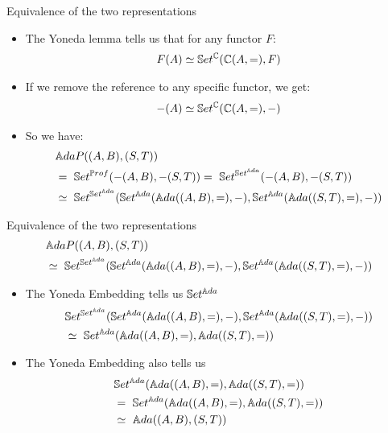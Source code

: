 \begin{frame}[fragile]{Equivalence of the two representations}
	\begin{itemize}
		\item The Yoneda lemma tells us that for any functor $F$:
		\begin{align*}
			F(A) \simeq \mathbb{S}et^{\mathbb{C}}(\mathbb{C}(A, =), F)
		\end{align*}
		\pause\item If we remove the reference to any specific functor, we get:
		\begin{align*}
			-(A) \simeq \mathbb{S}et^{\mathbb{C}}(\mathbb{C}(A, =), -)
		\end{align*}
		\vspace{-18pt}\pause\item So we have:
		\begin{align*}
			&\bAdaP ((A,B),(S,T))\\
			&=\ \bSet^{\bProf}(-(A, B), -(S, T)) =\ \bSet^{\bSet^\bAda}(-(A, B), -(S, T)) \\ 
			&\simeq\ \bSet^{\bSet^\bAda}(\bSet^\bAda(\bAda((A, B), =), -), \bSet^\bAda(\bAda((S, T), =), -))\\
		\end{align*}
	\end{itemize}
\end{frame}
\begin{frame}[fragile]{Equivalence of the two representations}
	\begin{align*}
		&\mathbb{A}daP ((A,B),(S,T))\\
		&\simeq\ \mathbb{S}et^{\mathbb{S}et^{\mathbb{A}da}}(\mathbb{S}et^{\mathbb{A}da}({\mathbb{A}da}((A, B), =), -), \mathbb{S}et^{\mathbb{A}da}({\mathbb{A}da}((S, T), =), -))
	\end{align*}
	\vspace{-16pt}
	\begin{itemize}
		\item The Yoneda Embedding tells us $\mathbb{S}et^{\mathbb{A}da}$
		\begin{align*}
			&\mathbb{S}et^{\mathbb{S}et^{\mathbb{A}da}}(\mathbb{S}et^{\mathbb{A}da}({\mathbb{A}da}((A, B), =), -), \mathbb{S}et^{\mathbb{A}da}({\mathbb{A}da}((S, T), =), -))\\ 
			&\simeq\  \mathbb{S}et^{\mathbb{A}da}({\mathbb{A}da}((A,B), =), {\mathbb{A}da}((S,T), =))
		\end{align*}
		\item The Yoneda Embedding also tells us 
		\begin{align*}
			&\mathbb{S}et^{\mathbb{A}da}({\mathbb{A}da}((A,B), =), {\mathbb{A}da}((S,T), =))\\
			&=\ \mathbb{S}et^{\mathbb{A}da}({\mathbb{A}da}((A,B), =), {\mathbb{A}da}((S,T), =))\\
			&\simeq\ {\mathbb{A}da}((A,B), (S,T))
		\end{align*}
	\end{itemize}
\end{frame}
